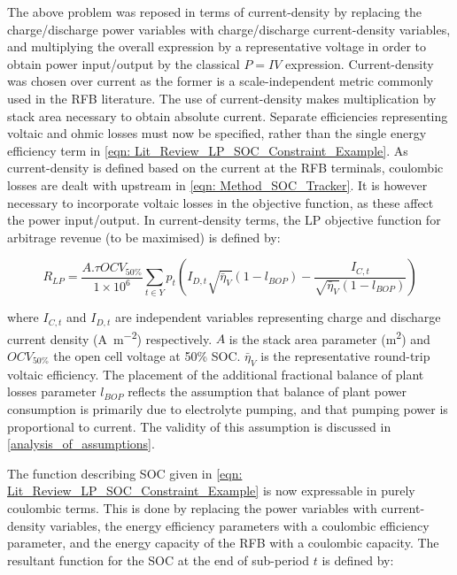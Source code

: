 \documentclass[preprint,3p,review,authoryear,10pt]{elsarticle}
\begin{document}
The above problem was reposed in terms of current-density by replacing the charge/discharge power variables with charge/discharge current-density variables, and multiplying the overall expression by a representative voltage in order to obtain power input/output by the classical $P = IV$ expression. Current-density was chosen over current as the former is a scale-independent metric commonly used in the RFB literature. The use of current-density makes multiplication by stack area necessary to obtain absolute current. Separate efficiencies representing voltaic and ohmic losses must now be specified, rather than the single energy efficiency term in \cref{eqn: Lit_Review_LP_SOC_Constraint_Example}. As current-density is defined based on the current at the RFB terminals, coulombic losses are dealt with upstream in \cref{eqn: Method_SOC_Tracker}. It is however necessary to incorporate voltaic losses in the objective function, as these affect the power input/output.  In current-density terms, the LP objective function for arbitrage revenue (to be maximised) is defined by:


\begin{equation}
\label{eqn: Linear_Schedule_Objective_Function_Current_as_Variable}
R_{LP} = \frac{A.\tau OCV_{50\%}}{1\times 10^{6}}\sum_{t \in Y}p_{t}(I_{D, t}\sqrt{\bar\eta_{V}}(1 - l_{BOP}) - \frac{I_{C,t}}{\sqrt{\bar\eta_{V}}(1 - l_{BOP})})
\end{equation}

where $I_{C,t}$ and $I_{D,t}$ are independent variables representing charge and discharge current density (\si{\ampere\per\square\meter}) respectively. $A$ is the stack area parameter (\si{\square\meter}) and $OCV_{50\%}$ the open cell voltage at 50\% SOC. $\bar\eta_{V}$ is the representative round-trip voltaic efficiency. The  placement of the additional fractional balance of plant losses parameter $l_{BOP}$ reflects the assumption that balance of plant power consumption is primarily due to electrolyte pumping, and that pumping power is proportional to current. The validity of this assumption is discussed in \cref{analysis_of_assumptions}. 

The function describing SOC given in \cref{eqn: Lit_Review_LP_SOC_Constraint_Example} is now expressable in purely coulombic terms. This is done by replacing the power variables with current-density variables, the energy efficiency parameters with a coulombic efficiency parameter, and the energy capacity of the RFB with a coulombic capacity. The resultant function for the SOC at the end of sub-period $t$ is defined by:
\end{document}

